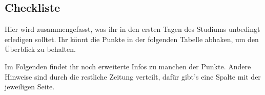 \begin{multicols}{2}
\subsection{Checkliste}
\label{checkliste}
	
	Hier wird zusammengefasst, was ihr in den ersten Tagen des Studiums
	unbedingt erledigen solltet. Ihr könnt die Punkte in der folgenden
	Tabelle abhaken, um den Überblick zu behalten.

	Im Folgenden findet ihr noch erweiterte Infos zu manchen der Punkte. 
	Andere Hinweise sind durch die restliche Zeitung verteilt, dafür 
	gibt's eine Spalte mit der jeweiligen Seite.
\end{multicols}



